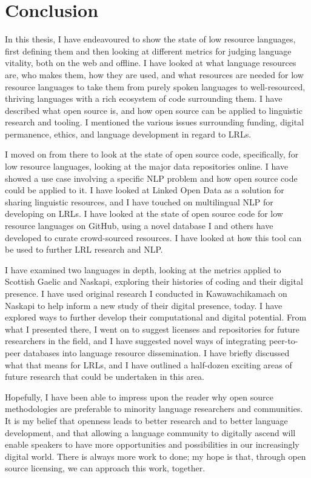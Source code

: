 \section{Conclusion}
\label{sec:conclusion}

In this thesis, I have endeavoured to show the state of low resource languages, first defining them and then looking at different metrics for judging language vitality, both on the web and offline. I have looked at what language resources are, who makes them, how they are used, and what resources are needed for low resource languages to take them from purely spoken languages to well-resourced, thriving languages with a rich ecosystem of code surrounding them. I have described what open source is, and how open source can be applied to linguistic research and tooling. I mentioned the various issues surrounding funding, digital permanence, ethics, and language development in regard to LRLs.

I moved on from there to look at the state of open source code, specifically, for low resource languages, looking at the major data repositories online. I have showed a use case involving a specific NLP problem and how open source code could be applied to it. I have looked at Linked Open Data as a solution for sharing linguistic resources, and I have touched on multilingual NLP for developing on LRLs. I have looked at the state of open source code for low resource languages on GitHub, using a novel database I and others have developed to curate crowd-sourced resources. I have looked at how this tool can be used to further LRL research and NLP. 

I have examined two languages in depth, looking at the metrics applied to Scottish Gaelic and Naskapi, exploring their histories of coding and their digital presence. I have used original research I conducted in Kawawachikamach on Naskapi to help inform a new study of their digital presence, today. I have explored ways to further develop their computational and digital potential. From what I presented there, I went on to suggest licenses and repositories for future researchers in the field, and I have suggested novel ways of integrating peer-to-peer databases into language resource dissemination. I have briefly discussed what that means for LRLs, and I have outlined a half-dozen exciting areas of future research that could be undertaken in this area.

Hopefully, I have been able to impress upon the reader why open source methodologies are preferable to minority language researchers and communities. It is my belief that openness leads to better research and to better language development, and that allowing a language community to digitally ascend will enable speakers to have more opportunities and possibilities in our increasingly digital world. There is always more work to done; my hope is that, through open source licensing, we can approach this work, together.